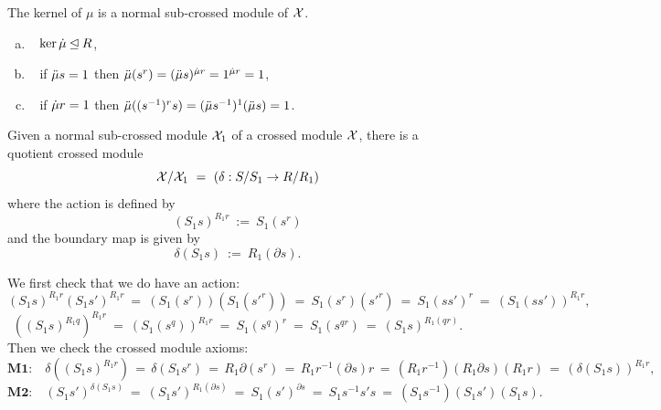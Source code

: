 \begin{lem}  
The kernel of $\mu$ is a normal sub-crossed module of $\mathcal{X}$.
\end{lem}
\begin{pf}
\begin{enumerate}[(a)]
\item~ $\ker\dot{\mu} \unlhd R$,
\item~ if $\ddot{\mu} s = 1$ then $\ddot{\mu}(s^r) = (\ddot{\mu} s)^{\dot{\mu} r} = 1^{\dot{\mu} r} = 1$,
\item~ if $\dot{\mu} r = 1$ then 
$\ddot{\mu}((s^{-1})^rs) = (\ddot{\mu} s^{-1})^1(\ddot{\mu} s) = 1$.
\end{enumerate}
\end{pf}

\begin{thm}
Given a normal sub-crossed module $\mathcal{X}_1$
of a crossed module $\mathcal{X}$, there is a quotient crossed module
$$
\mathcal{X}/\mathcal{X}_1 ~=~ ( \delta : S/S_1 \to R/R_1 )
$$
where the action is defined by
$$
(S_1s)^{R_1r} ~:=~ S_1(s^r)
$$
and the boundary map is given by
$$
\delta (S_1s) ~:=~ R_1(\partial s).
$$
\end{thm}
\begin{pf}
We first check that we do have an action:
$$
(S_1s)^{R_1r}(S_1s')^{R_1r} ~=~
(S_1(s^r))(S_1({s'}^r)) ~=~
S_1(s^r)({s'}^r) ~=~
S_1(ss')^r ~=~
(S_1(ss'))^{R_1r},
$$
$$
((S_1s)^{R_1q})^{R_1r} ~=~
(S_1(s^q))^{R_1r} ~=~
S_1(s^q)^r ~=~
S_1(s^{qr}) ~=~
(S_1s)^{R_1(qr)}.
$$
Then we check the crossed module axioms:
$$
\textbf{M1:}\quad
\delta((S_1s)^{R_1r}) \,=\,
\delta(S_1 s^r) \,=\,
R_1 \partial(s^r) \,=\,
R_1 r^{-1}(\partial s)r \,=\,
(R_1r^{-1})(R_1 \partial s)(R_1r) \,=\,
(\delta(S_1s))^{R_1r},
$$
$$
\textbf{M2:}\quad
(S_1s')^{\delta(S_1s)} ~=~
(S_1s')^{R_1(\partial s)} ~=~
S_1 (s')^{\partial s} ~=~
S_1 s^{-1}s's ~=~
(S_1 s^{-1})(S_1 s')(S_1 s).\qquad\qquad\qquad
$$
\end{pf}

